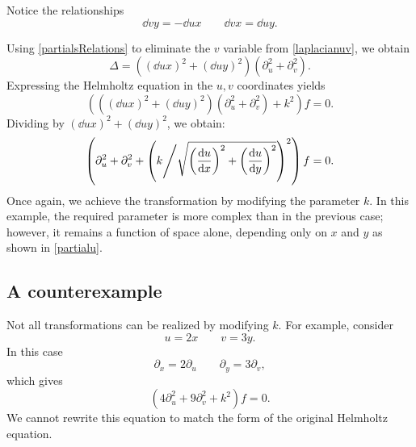 Notice the relationships
\begin{equation}\label{partialsRelations}
	\dd{v}{y}=-\dd{u}{x} \qquad
	\dd{v}{x}=\dd{u}{y}.
\end{equation}

Using \eqref{partialsRelations} to eliminate the \(v\) variable from
\eqref{laplacianuv}, we obtain
\begin{equation}\label{laplacianuvsimplified}
	\Delta=\left(
	\left(\dd{u}{x}\right)^2
	+\left(\dd{u}{y}\right)^2\right)
	\left(\partial_u^2+\partial_v^2 \right).
\end{equation}
Expressing the Helmholtz equation in the \(u,v\)
coordinates yields
\begin{equation*}
\left(
\left(\left(\dd{u}{x}\right)^2
+\left(\dd{u}{y}\right)^2\right)
\left(\partial_u^2+\partial_v^2\right)+ k^2\right)f=0.
\end{equation*}
Dividing by \(\left(\dd{u}{x}\right)^2
+\left(\dd{u}{y}\right)^2\), we obtain:
\begin{equation}
\left(
	\partial_u^2+\partial_v^2
	+\left(
	k\middle/\sqrt{\left(\frac{\mathrm{d}u}{\mathrm{d}x}\right)^2
	+\left(\frac{\mathrm{d}u}{\mathrm{d}y}\right)^2}
	\right)^2
\right)f=0.
\end{equation}
Once again, we achieve the transformation by modifying the
parameter \(k\). In this example, the required parameter is more
complex than in the previous case; however, it remains a function of space
alone, depending only on \(x\) and \(y\) as shown in \eqref{partialu}.

\subsection{A counterexample}
Not all transformations can be realized by modifying \(k\). For example,
consider
\begin{equation*}
	u=2x \qquad
	v=3y.
\end{equation*}
In this case
\begin{equation*}
	\partial_x=2\partial_u \qquad
	\partial_y=3\partial_v,
\end{equation*}
which gives
\begin{equation*}
	(4\partial_u^2 + 9\partial_v^2 + k^2)f=0.
\end{equation*}
We cannot rewrite this equation to match the form of the original
Helmholtz equation.

